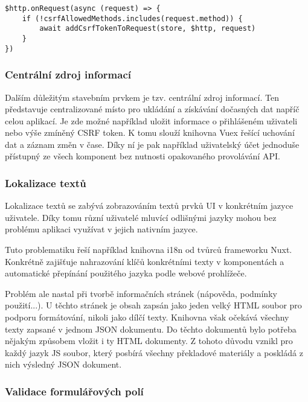 		\begin{lstlisting}[caption={Ukázka vložení CSRF tokenu do každého požadavku putujícího na API server. Zdroj: [autor]}]
$http.onRequest(async (request) => {
	if (!csrfAllowedMethods.includes(request.method)) {
		await addCsrfTokenToRequest(store, $http, request)
	}
})
		\end{lstlisting}

		\subsubsection{Centrální zdroj informací}

		Dalším důležitým stavebním prvkem je tzv. centrální zdroj informací.
		Ten představuje centralizované místo pro ukládání a získávání dočasných dat napříč celou aplikací.
		Je zde možné například uložit informace o přihlášeném uživateli nebo výše zmíněný \ac{CSRF} token.
		K tomu slouží knihovna Vuex řešící uchování dat a záznam změn v čase.
		Díky ní je pak například uživatelský účet jednoduše přístupný ze všech komponent bez nutnosti opakovaného provolávání
		\ac{API}.

		\subsubsection{Lokalizace textů}

		Lokalizace textů se zabývá zobrazováním textů prvků \ac{UI} v konkrétním jazyce uživatele.
		Díky tomu různí uživatelé mluvící odlišnými jazyky mohou bez problému aplikaci využívat v jejich nativním jazyce.

		Tuto problematiku řeší například knihovna i18n od tvůrců frameworku Nuxt.
		Konkrétně zajišťuje nahrazování klíčů konkrétními texty v komponentách a automatické přepínání použitého jazyka
		podle webové prohlížeče.

		Problém ale nastal při tvorbě informačních stránek (nápověda, podmínky použití...).
		U těchto stránek je obsah zapsán jako jeden velký \ac{HTML} soubor pro podporu formátování, nikoli
		jako dílčí texty.
		Knihovna však očekává všechny texty zapsané v jednom \ac{JSON} dokumentu.
		Do těchto dokumentů bylo potřeba nějakým způsobem vložit i ty \ac{HTML} dokumenty.
		Z tohoto důvodu vznikl pro každý jazyk \ac{JS} soubor, který posbírá všechny překladové materiály a poskládá z nich
		výsledný \ac{JSON} dokument.

		\subsubsection{Validace formulářových polí}

